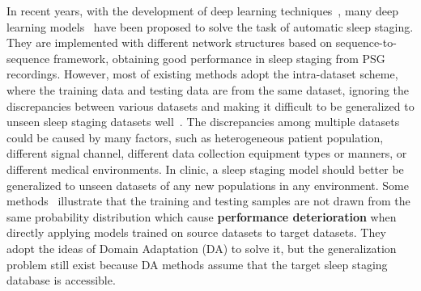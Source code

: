 \documentclass[letterpaper]{article} %
\begin{document}
	
	 In recent years, with the development of deep learning techniques~\citep{sun2016remembered, pan2018rapid, yi2021hippocampal, Wang2023ARO}, many deep learning models~\citep{phan2022automatic} have been proposed to solve the task of automatic sleep staging.
	They are implemented with different network structures based on sequence-to-sequence framework, obtaining good performance in sleep staging from PSG recordings.
	However, most of existing methods adopt the intra-dataset scheme, where the training data and testing data are from the same dataset, ignoring the discrepancies between various datasets and making it difficult to be generalized to unseen sleep staging datasets well~\citep{anido2022analysis}.
	The discrepancies among multiple datasets could be caused by many factors, such as heterogeneous patient population,  different signal channel, different data collection equipment types or manners, or different medical environments. 
	In clinic, a sleep staging model should better be generalized to unseen datasets of any new populations in any environment.
	Some methods~\citep{yoo2021transferring, fan2022unsupervised, wang2022automatic} illustrate that the training and testing samples are not drawn from the same probability distribution which cause \textbf{performance deterioration} when directly applying models trained on source datasets to target datasets. They adopt the ideas of Domain Adaptation (DA) to solve it, but the generalization problem still exist because DA methods assume that the target sleep staging database is accessible.
	
	
\end{document}
